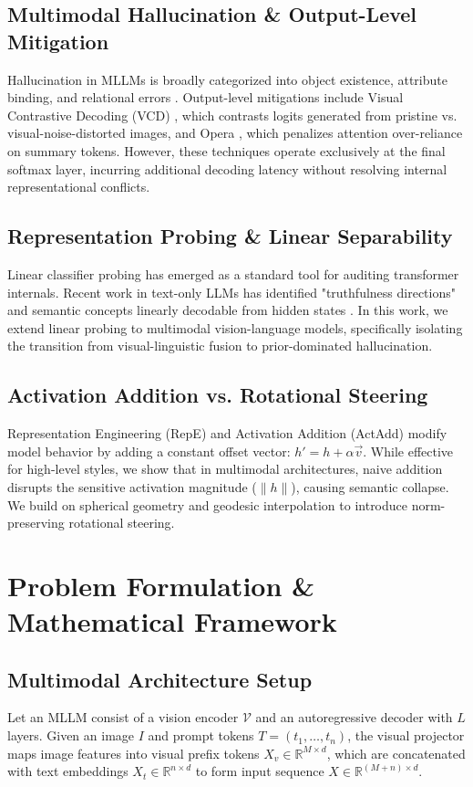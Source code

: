 \documentclass[11pt]{article}
\begin{document}
\subsection{Multimodal Hallucination \& Output-Level Mitigation}
Hallucination in MLLMs is broadly categorized into object existence, attribute binding, and relational errors \cite{pope, hallucination_survey}. Output-level mitigations include Visual Contrastive Decoding (VCD) \cite{vcd}, which contrasts logits generated from pristine vs. visual-noise-distorted images, and Opera \cite{opera}, which penalizes attention over-reliance on summary tokens. However, these techniques operate exclusively at the final softmax layer, incurring additional decoding latency without resolving internal representational conflicts.

\subsection{Representation Probing \& Linear Separability}
Linear classifier probing \cite{linear_probes} has emerged as a standard tool for auditing transformer internals. Recent work in text-only LLMs has identified "truthfulness directions" and semantic concepts linearly decodable from hidden states \cite{lie_detection, rep_engineering}. In this work, we extend linear probing to multimodal vision-language models, specifically isolating the transition from visual-linguistic fusion to prior-dominated hallucination.

\subsection{Activation Addition vs. Rotational Steering}
Representation Engineering (RepE) \cite{rep_engineering} and Activation Addition (ActAdd) \cite{activation_steering} modify model behavior by adding a constant offset vector: $h' = h + \alpha \vec{v}$. While effective for high-level styles, we show that in multimodal architectures, naive addition disrupts the sensitive activation magnitude ($\|h\|$), causing semantic collapse. We build on spherical geometry and geodesic interpolation \cite{slerp_shoemake} to introduce norm-preserving rotational steering.

\section{Problem Formulation \& Mathematical Framework}

\subsection{Multimodal Architecture Setup}
Let an MLLM consist of a vision encoder $\mathcal{V}$ and an autoregressive decoder with $L$ layers. Given an image $I$ and prompt tokens $T = (t_1, \dots, t_n)$, the visual projector maps image features into visual prefix tokens $X_v \in \mathbb{R}^{M \times d}$, which are concatenated with text embeddings $X_t \in \mathbb{R}^{n \times d}$ to form input sequence $X \in \mathbb{R}^{(M+n) \times d}$.
\end{document}
